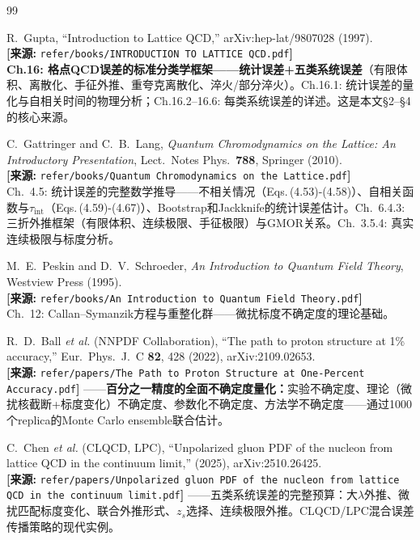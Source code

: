 \documentclass[12pt,a4paper]{ctexart}
\begin{document}
\begin{thebibliography}{99}

R.~Gupta,
``Introduction to Lattice QCD,''
arXiv:hep-lat/9807028 (1997).
\\\textbf{[来源:} \texttt{refer/books/INTRODUCTION TO LATTICE QCD.pdf}\textbf{]}
\\\textbf{Ch.16: 格点QCD误差的标准分类学框架——统计误差+五类系统误差}（有限体积、离散化、手征外推、重夸克离散化、淬火/部分淬火）。Ch.16.1: 统计误差的量化与自相关时间的物理分析；Ch.16.2--16.6: 每类系统误差的详述。这是本文§2--§4的核心来源。

C.~Gattringer and C.~B.~Lang,
\textit{Quantum Chromodynamics on the Lattice: An Introductory Presentation},
Lect.\ Notes Phys.\ \textbf{788}, Springer (2010).
\\\textbf{[来源:} \texttt{refer/books/Quantum Chromodynamics on the Lattice.pdf}\textbf{]}
\\Ch.~4.5: 统计误差的完整数学推导——不相关情况（Eqs.\,(4.53)-(4.58)）、自相关函数与$\tau_{\text{int}}$（Eqs.\,(4.59)-(4.67)）、Bootstrap和Jackknife的统计误差估计。Ch.~6.4.3: 三折外推框架（有限体积、连续极限、手征极限）与GMOR关系。Ch.~3.5.4: 真实连续极限与标度分析。

M.~E.~Peskin and D.~V.~Schroeder,
\textit{An Introduction to Quantum Field Theory},
Westview Press (1995).
\\\textbf{[来源:} \texttt{refer/books/An Introduction to Quantum Field Theory.pdf}\textbf{]}
\\Ch.~12: Callan--Symanzik方程与重整化群——微扰标度不确定度的理论基础。

R.~D.~Ball \textit{et al.} (NNPDF Collaboration),
``The path to proton structure at 1\% accuracy,''
Eur.\ Phys.\ J.\ C \textbf{82}, 428 (2022), arXiv:2109.02653.
\\\textbf{[来源:} \texttt{refer/papers/The Path to Proton Structure at One-Percent Accuracy.pdf}\textbf{]}
——\textbf{百分之一精度的全面不确定度量化：}实验不确定度、理论（微扰核截断+标度变化）不确定度、参数化不确定度、方法学不确定度——通过1000个replica的Monte Carlo ensemble联合估计。

C.~Chen \textit{et al.} (CLQCD, LPC),
``Unpolarized gluon PDF of the nucleon from lattice QCD in the continuum limit,''
(2025), arXiv:2510.26425.
\\\textbf{[来源:} \texttt{refer/papers/Unpolarized gluon PDF of the nucleon from lattice QCD in the continuum limit.pdf}\textbf{]}
——五类系统误差的完整预算：大$\lambda$外推、微扰匹配标度变化、联合外推形式、$z_s$选择、连续极限外推。CLQCD/LPC混合误差传播策略的现代实例。


\end{thebibliography}
\end{document}
